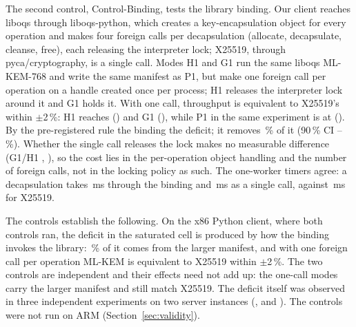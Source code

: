 \documentclass[review,12pt]{elsarticle}
\newcommand{\lab}[1]{\textsf{#1}}
\begin{document}
The second control, \lab{Control-Binding}, tests the library binding. Our client reaches liboqs through liboqs-python,
which creates a key-encapsulation object for every operation and makes four foreign calls per
decapsulation (allocate, decapsulate, cleanse, free), each releasing the interpreter lock;
X25519, through pyca/cryptography, is a single call. Modes H1 and G1 run the same liboqs
ML-KEM-768 and write the same manifest as P1, but make one foreign call per operation on a
handle created once per process; H1 releases the interpreter lock around it and G1 holds it.
With one call, throughput is equivalent to X25519's within $\pm$2\,\%: H1 reaches
\AudBindReleasedRatio{} (\AudBindReleasedCI) and G1 \AudBindHeldRatio{} (\AudBindHeldCI),
while P1 in the same experiment is at \AudLFullRatio{} (\AudLFullCI). By the
pre-registered rule the binding \emph{\AudBindVerdict} the deficit; it removes
\AudBindReleasedRemoved\,\% of it (90\,\% CI
\AudBindReleasedRemovedLo--\AudBindReleasedRemovedHi\,\%). Whether the single call releases the
lock makes no measurable difference (G1/H1 \AudBindHeldOverReleased, \AudBindHeldOverReleasedCI),
so the cost lies in the per-operation object handling and the number of foreign calls, not in
the locking policy as such. The one-worker timers agree: a decapsulation takes
\AudBindBindingKeOne\,ms through the binding and \AudBindReleasedKeOne\,ms as a single call,
against \AudBindEcdhKeOne\,ms for X25519.

\begin{table}[!htbp]
\caption{Controls on 64\,KiB GET (\lab{Control-Manifest} and \lab{Control-Binding}, ten repetitions, x86 Python client): paired ratios with 90\,\% intervals. ``Padded manifest'' = X25519 with a manifest as large as ML-KEM's; ``binding'' = ML-KEM-768 through liboqs-python (mode P1); ``one call'' = the same ML-KEM-768 through a single foreign call per operation.}
\label{tab:control}
\centering\footnotesize
{}
\end{table}

The controls establish the following. On the x86 Python client, where both controls ran, the
deficit in the saturated cell is produced by how the binding invokes the library:
\AudPadShare\,\% of it comes from the larger manifest, and with one foreign call per operation
ML-KEM is equivalent to X25519 within $\pm$2\,\%. The two controls are independent and their
effects need not add up: the one-call modes carry the larger manifest and still match X25519.
The deficit itself was observed in three independent experiments on two server instances
(\RevHotRatio, \AudJFullRatio{} and \AudLFullRatio). The controls were not run on ARM
(Section~\ref{sec:validity}).
\end{document}
